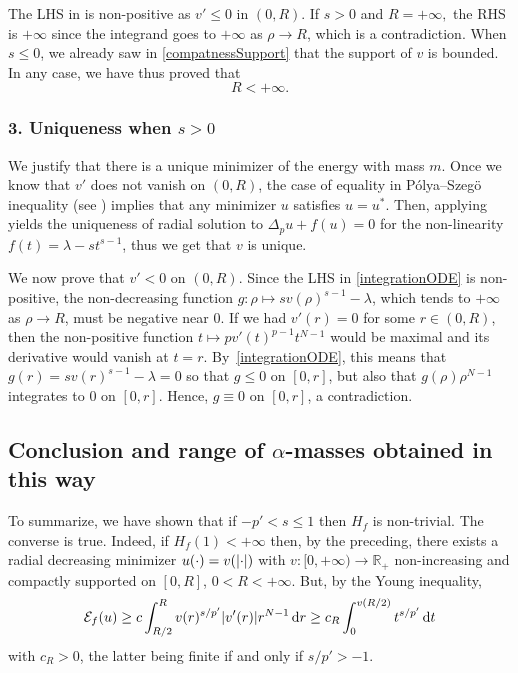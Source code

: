 \documentclass[10pt]{amsart}
\theoremstyle{plain}
\theoremstyle{definition}
\newcommand{\dd}{\mathop{}\mathopen{}\mathrm{d}}
\newcommand{\R}{\mathbb{R}}
\newcommand{\ener}{\mathcal{E}}
\DeclarePairedDelimiter{\abs}{\lvert}{\rvert}
\begin{document}
The LHS in  is non-positive as $v'\leq 0$ in $(0,R)$. If $s > 0$ and $R=+\infty,$ the RHS is $+\infty$ since the integrand goes to $+\infty$ as $\rho\to R$, which is a contradiction. When $s\leq 0$, we already saw in \eqref{compatnessSupport} that the support of $v$ is bounded. In any case, we have thus proved that\vspace*{-3pt}
\[
R<+\infty.
\]

\subsubsection*{\textup{3}. Uniqueness when $s>0$} We justify that there is a unique minimizer of the energy with mass $m$. Once we know that $v'$ does not vanish on $(0,R)$, the case of equality in Pólya–Szegö inequality (see \cite[Th.\,1.1]{brothersMinimalRearrangementsSobolev1988}) implies that any minimizer $u$ satisfies $u=u^*$. Then, applying \cite[Th.\,1]{serrinUniquenessGroundStates2000} yields the uniqueness of radial solution to $\Delta_p u+f(u)=0$ for the non-linearity $f(t)=\lambda-st^{s-1}$, thus we get that $v$ is unique.

We now prove that $v'<0$ on $(0,R)$. Since the LHS in \eqref{integrationODE} is non-positive, the non-decreasing function $g:\rho\mapsto sv(\rho)^{s-1}-\lambda$, which tends to $+\infty$ as $\rho\to R$, must be negative near $0$. If we had $v'(r)=0$ for some $r\in(0,R)$, then the non-positive function $t\mapsto pv'(t)^{p-1}t^{N-1}$ would be maximal and its derivative would vanish at $t=r$. By~\eqref{integrationODE}, this means that $g(r)=sv(r)^{s-1}-\lambda=0$ so that $g\leq 0$ on $[0,r]$, but also that $g(\rho)\rho^{N-1}$ integrates to $0$ on $[0,r]$. Hence, $g\equiv 0$ on $[0,r]$, a contradiction.

\subsection*{Conclusion and range of $\alpha$-masses obtained in this way} To summarize, we have shown that if \(-p'<s\leq 1\) then $H_{f}$ is non-trivial. The converse is true. Indeed, if $H_f(1)<+\infty$ then, by the preceding, there exists a radial decreasing minimizer $u(\cdot)=v(\abs{\cdot})$ with $v:[0,+\infty)\to\R_+$ non-increasing and compactly supported on $[0,R]$, $0<R<+\infty$. But, by the Young inequality,
\[
\ener_f(u)\geq c\int_{R/2}^R v(r)^{s/p'}\abs{v'(r)}r^{N-1}\dd r\geq c_R\int_0^{v(R/2)}t^{s/p'}\dd t
\]
with $c_R>0$, the latter being finite if and only if $s/p'>-1$.
\end{document}

